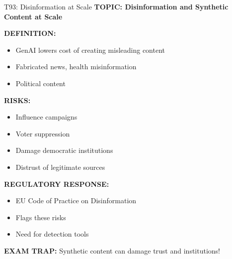 \documentclass[8pt]{beamer}
\begin{document}
	\begin{frame}{T93: Disinformation at Scale}
		\fontsize{6.5}{7.5}\selectfont
		\textbf{TOPIC: Disinformation and Synthetic Content at Scale}
		
		\vspace{0.1cm}
		\textbf{DEFINITION:}
		\begin{itemize}
			\item GenAI lowers cost of creating misleading content
			\item Fabricated news, health misinformation
			\item Political content
		\end{itemize}
		
		\vspace{0.1cm}
		\textbf{RISKS:}
		\begin{itemize}
			\item Influence campaigns
			\item Voter suppression
			\item Damage democratic institutions
			\item Distrust of legitimate sources
		\end{itemize}
		
		\vspace{0.1cm}
		\textbf{REGULATORY RESPONSE:}
		\begin{itemize}
			\item EU Code of Practice on Disinformation
			\item Flags these risks
			\item Need for detection tools
		\end{itemize}
		
		\textcolor{myred}{\textbf{EXAM TRAP:}} Synthetic content can \textcolor{myblue}{damage trust and institutions}!
	\end{frame}
	
\end{document}
